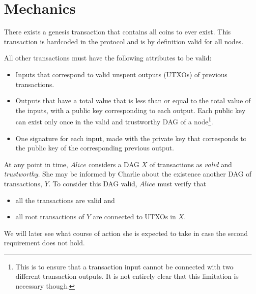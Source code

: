 \section{Mechanics}
  There exists a genesis transaction that contains all coins to ever exist. This
  transaction is hardcoded in the protocol and is by definition valid for all nodes.
  \begin{center}
    \begin{dot2tex}[outputdir=dot2tex/, file=coinbase]
      
    \end{dot2tex}
  \end{center}
  All other transactions must have the following attributes to be valid:
  \begin{itemize}
    \item Inputs that correspond to valid unspent outputs (UTXOs) of previous
    transactions.
    \item Outputs that have a total value that is less than or equal to the total value of
      the inputs, with a public key corresponding to each output. Each public key can
      exist only once in the valid and trustworthy DAG of a node\footnote{This is to
      ensure that a transaction input cannot be connected with two different transaction
      outputs. It is not entirely clear that this limitation is necessary though.}.
    \item One signature for each input, made with the private key that corresponds to the
      public key of the corresponding previous output.
  \end{itemize}
  At any point in time, $Alice$ considers a DAG $X$ of transactions as \textit{valid} and
  \textit{trustworthy}. She may be informed by Charlie about the existence another DAG of
  transactions, $Y$. To consider this DAG valid, $Alice$ must verify that
  \begin{itemize}
    \item all the transactions are valid and
    \item all root transactions of $Y$ are connected to UTXOs in $X$.
  \end{itemize}
  We will later see what course of action she is expected to take in case the second
  requirement does not hold.

